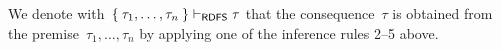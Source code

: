 We denote with~$\left\{\:\tau_{1}, \ldots, \tau_{n}\:\right\} \vdash_{\mathsf{RDFS}} \tau$ that the consequence~$\tau$ is obtained from
the premise~$\tau_{1}, \ldots, \tau_{n}$ by applying one of the inference rules 2--5 above.
% 


